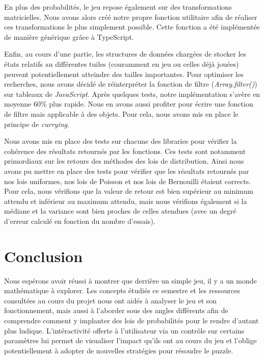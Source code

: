 \documentclass[a4paper, 12pt]{report}
\begin{document}
\vspace{0.5cm}

\tabto{1cm}En plus des probabilités, le jeu repose également sur des transformations
matricielles. Nous avons alors créé notre propre fonction utilitaire afin de réaliser ces transformations le plus
simplement possible. Cette fonction a été implémentée de manière générique grâce à TypeScript.

\vspace{0.5cm}

\tabto{1cm}Enfin, au cours d'une partie, les structures de données chargées de stocker les états relatifs au différentes tuiles
(couramment en jeu ou celles déjà jouées) peuvent potentiellement atteindre des tailles importantes. Pour optimiser les recherches, 
nous avons décidé de réinterpréter la fonction de filtre (\textit{Array.filter()}) sur tableaux de \textit{JavaScript}.
Après quelques tests, notre implémentation s'avère en moyenne 60\% plus rapide. Nous en avons aussi profiter pour écrire une fonction
de filtre mais applicable à des objets. Pour cela, nous avons mis en place le principe de \textit{currying}.

\vspace{0.5cm}

\tabto{1cm}Nous avons mis en place des tests sur chacune des libraries pour vérifier la cohérence des résultats retournés par les fonctions.
Ces tests sont notamment primordiaux sur les retours des méthodes des lois de distribution. Ainsi nous avons pu mettre en place des tests pour
vérifier que les résultats retournés par nos lois uniformes, nos lois de Poisson et nos lois de Bernouilli étaient corrects. Pour cela, nous
vérifions que la valeur de retour est bien supérieur au minimum attendu et inférieur au maximum attendu, mais nous vérifions également si la 
médiane et la variance sont bien proches de celles atendues (avec un degré d'erreur calculé en fonction du nombre d'essais).

\chapter{Conclusion}

\tabto{1cm}Nous espérons avoir réussi à montrer que derrière un simple jeu, il y a un monde
mathématique à explorer. Les concepts étudiés ce semestre et les ressources consultées au
cours du projet nous ont aidés à analyser le jeu et son fonctionnement, mais aussi à l'aborder
sous des angles différents afin de comprendre comment y implanter des lois de probabilités
pour le rendre d'autant plus ludique. L'intéractivité offerte à l'utilisateur via un contrôle
sur certains paramètres lui permet de visualiser l'impact qu'ils ont au cours du jeu et l'oblige 
potentiellement à adopter de nouvelles stratégies pour résoudre le puzzle.
\end{document}
